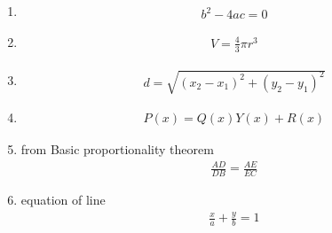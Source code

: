 \documentclass[]{article}
\begin{document}
\begin{enumerate}[label=\thesubsection.\arabic*, ref=\thesubsection.\theenumi]

\item 
\begin{align}
    b^2 -4ac =0 \label{eq:EE26BTECH11222-condition for equal roots-prob 1}
\end{align}

\item 
\begin{align}
    V=\frac{4}{3}\pi r^3 \label{eq:EE26BTECH11222-prob 3}
\end{align}

\item 
\begin{align}
    d=\sqrt{(x_2-x_1)^2+(y_2-y_1)^2} \label{eq:EE26BTECH11222-prob 4}
\end{align}

\item 
\begin{align}
    P(x)=Q(x)Y(x)+R(x) \label{eq:ee26btech11222-prob 6}
\end{align}

\item from Basic proportionality theorem
\begin{align}
    \frac{AD}{DB}=\frac{AE}{EC} \label{eq:ee26btech11222-prob 7}
\end{align}

\item equation of line 
\begin{align}
    \frac{x}{a} +\frac{y}{b}=1
\end{align}

\end{enumerate}
\end{document}
